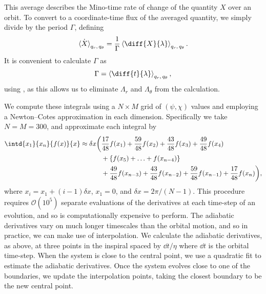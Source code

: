 This average describes the Mino-time rate of change of the quantity $X$ over an orbit. To convert to a coordinate-time flux of the averaged quantity, we simply divide by the period $\Gamma$, defining
\begin{equation}
\dot{\left\langle X\right\rangle}_{q_r,\,q_\theta} = \frac{1}{\Gamma}\left\langle \diff{X}{\lambda}\right\rangle_{q_r,\,q_\theta}.
\end{equation}
It is convenient to calculate $\Gamma$ as
\begin{equation}
\Gamma = \left\langle \diff{t}{\lambda}\right\rangle_{q_r,\,q_\theta},
\end{equation}
using , as this allows us to eliminate $\Lambda_r$ and $\Lambda_\theta$ from the calculation.

We compute these integrals using a $N\times M$ grid of $(\psi,\chi)$ values and employing a Newton--Cotes approximation in each dimension. Specifically we take $N = M = 300$, and approximate each integral by
\begin{align}
\intd{x_1}{x_n}{f(x)}{x} \approx \delta x \bigg(&\frac{17}{48}f(x_1) + \frac{59}{48}f(x_2) + \frac{43}{48}f(x_3) + \frac{49}{48}f(x_4)\nonumber\\
& + \left\{f(x_5) + \ldots + f(x_{n-4})\right\}\nonumber\\
& + \frac{49}{48}f(x_{n-3}) + \frac{43}{48}f(x_{n-2}) + \frac{59}{48}f(x_{n-1}) +  \frac{17}{48}f(x_n)\bigg),
\end{align}
where $x_i = x_1 + (i-1)\delta x$, $x_1 = 0$, and $\delta x = 2\pi / (N-1)$. This procedure requires $\mathcal{O}(10^5)$ separate evaluations of the derivatives at each time-step of an evolution, and so is computationally expensive to perform. The adiabatic derivatives vary on much longer timescales than the orbital motion, and so in practice, we can make use of interpolation. We calculate the adiabatic derivatives, as above, at three points in the inspiral spaced by $\dd t/\eta$ where $\dd t$ is the orbital time-step. When the system is close to the central point, we use a quadratic fit to estimate the adiabatic derivatives. Once the system evolves close to one of the boundaries, we update the interpolation points, taking the closest boundary to be the new central point.

